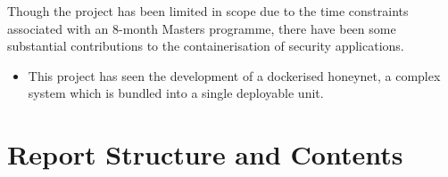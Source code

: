 Though the project has been limited in scope due to the time constraints associated with an 8-month Masters programme, there have been some substantial contributions to the containerisation of security applications.
\begin{itemize}
	\item This project has seen the development of a dockerised honeynet, a complex system which is bundled into a single deployable unit.
\end{itemize}

\section{Report Structure and Contents}

